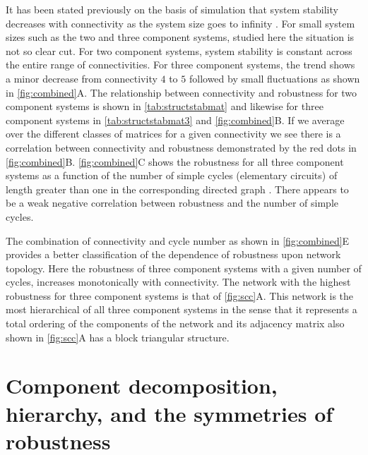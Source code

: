It has been stated previously on the basis of simulation that system stability decreases with connectivity as the system size goes to infinity \cite{May1972}. For small system sizes such as the two and three component systems, studied here the situation is not so clear cut. For two component systems, system stability is constant across the entire range of connectivities. For three component systems, the trend shows a minor decrease from connectivity $4$ to $5$ followed by small fluctuations as shown in \ref{fig:combined}A.
The relationship between connectivity and robustness for two component systems is shown in \ref{tab:structstabmat} and likewise for three component systems in \ref{tab:structstabmat3} and \ref{fig:combined}B. If we average over the different classes of matrices for a given connectivity we see there is a correlation between connectivity and robustness demonstrated by the red dots in \ref{fig:combined}B.
\ref{fig:combined}C shows the robustness for all three component systems as a function of the number of simple cycles (elementary circuits) of length greater than one in the corresponding directed graph \cite{Johnson1975}. There appears to be a weak negative correlation between robustness and the number of simple cycles.

The combination of connectivity and cycle number as shown in \ref{fig:combined}E provides a better classification of the dependence of robustness upon network topology. Here the robustness of three component systems with a given number of cycles, increases monotonically with connectivity. The network with the highest robustness for three component systems is that of \ref{fig:scc}A. This network is the most hierarchical of all three component systems in the sense that it represents a total ordering of the components of the network and its adjacency matrix also shown in \ref{fig:scc}A has a block triangular structure.

\section{Component decomposition, hierarchy, and the symmetries of robustness}

